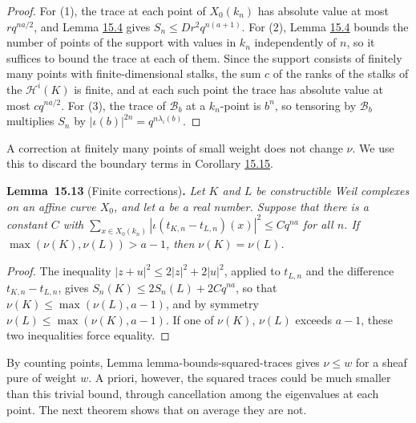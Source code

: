 \documentclass[11pt]{article}
\newenvironment{bpstatement}[2]{\par\addvspace{0.6\baselineskip}\noindent\textbf{#1}#2\textbf{.}\enspace\ignorespaces}
  {\par\addvspace{0.4\baselineskip}}
\newenvironment{bpstatementit}[2]{\begin{bpstatement}{#1}{#2}\itshape\ignorespaces}{\end{bpstatement}}
\begin{document}
\begin{proof}[{Proof}]\label{bp36}%
For (1), the trace at each point of \(X_0(k_n)\) has absolute value at most \(rq^{na/2}\), and Lemma \hyperref[bp10]{15.4} gives \(S_n\le Dr^2q^{n(a+1)}\). For (2), Lemma \hyperref[bp10]{15.4} bounds the number of points of the support with values in \(k_n\) independently of \(n\), so it suffices to bound the trace at each of them. Since the support consists of finitely many points with finite-dimensional stalks, the sum \(c\) of the ranks of the stalks of the \(\mathcal H^i(K)\) is finite, and at each such point the trace has absolute value at most \(cq^{na/2}\). For (3), the trace of \(\mathcal B_b\) at a \(k_n\)-point is \(b^n\), so tensoring by \(\mathcal B_b\) multiplies \(S_n\) by \(|\iota(b)|^{2n}=q^{n\lambda_\iota(b)}\).
\end{proof}

\label{bp37}%
A correction at finitely many points of small weight does not change \(\nu\). We use this to discard the boundary terms in Corollary \hyperref[bp44]{15.15}.

\label{bp38}%
\begin{bpstatementit}{Lemma~15.13}{ (Finite corrections)}
Let \(K\) and \(L\) be constructible Weil complexes on an affine curve \(X_0\), and let \(a\) be a real number. Suppose that there is a constant \(C\) with \(\sum_{x\in X_0(k_n)}|\iota(t_{K,n}-t_{L,n})(x)|^2\le Cq^{na}\) for all \(n\). If \(\max(\nu(K),\nu(L))>a-1\), then \(\nu(K)=\nu(L)\).
\end{bpstatementit}

\begin{proof}[{Proof}]\label{bp39}%
The inequality \(|z+u|^2\le2|z|^2+2|u|^2\), applied to \(t_{L,n}\) and the difference \(t_{K,n}-t_{L,n}\), gives \(S_n(K)\le2S_n(L)+2Cq^{na}\), so that \(\nu(K)\le\max(\nu(L),a-1)\), and by symmetry \(\nu(L)\le\max(\nu(K),a-1)\).  If one of \(\nu(K)\), \(\nu(L)\) exceeds \(a-1\), these two inequalities force equality.
\end{proof}

\label{bp40}%
By counting points, Lemma lemma-bounds-squared-traces gives \(\nu\le w\) for a sheaf pure of weight \(w\). A priori, however, the squared traces could be much smaller than this trivial bound, through cancellation among the eigenvalues at each point. The next theorem shows that on average they are not.
\end{document}
